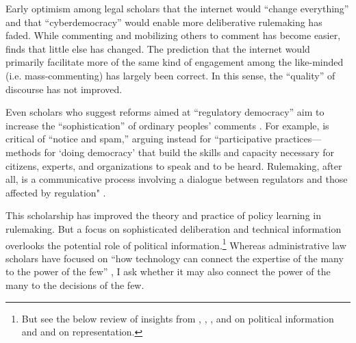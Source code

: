Early optimism among legal scholars that the internet would ``change everything'' \citep{Johnson1998} and that ``cyberdemocracy''  would enable more deliberative rulemaking has faded.  
While commenting and mobilizing others to comment has become easier, \citet{Coglianese2006} finds that little else has changed. %
The prediction that the internet would primarily facilitate more of the same kind of engagement among the like-minded (i.e. mass-commenting) \citep{Sunstein2001} has largely been correct. In this sense, the ``quality'' of discourse has not improved.

Even scholars who suggest reforms aimed at ``regulatory democracy'' aim to increase the ``sophistication'' of ordinary peoples' comments \citep{Cuellar2014, Johnson2013}. For example, \citet{Novek2004}  is critical of ``notice and spam,'' arguing instead for ``participative practices---methods for `doing democracy' that build the skills and capacity necessary for citizens, experts, and organizations to speak and to be heard. Rulemaking, after all, is a communicative process involving a dialogue between regulators and those affected by regulation" \citet[p. 3]{Noveck2005}.

This scholarship has improved the theory and practice of policy learning in rulemaking. But a focus on sophisticated deliberation and technical information overlooks the potential role of political information.\footnote{But see the below review of insights from \citet{Golden1998}, \citet{Nelson2012}, \citet{Rauch2016}, and \citet{Potter2017} on political information and \citet{Reich1966} and \citet{Seifter2016UCLA} on representation.} Whereas administrative law scholars have focused on ``how technology can connect the expertise of the many to the power of the few'' \citep{Noveck2009}, I ask whether it may also connect the power of the many to the decisions of the few.